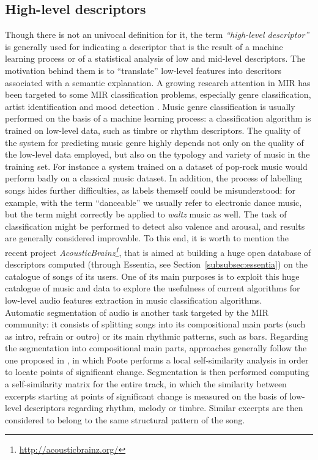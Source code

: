 \subsection{High-level descriptors}
Though there is not an univocal definition for it, the term \textit{``high-level descriptor''} is generally used for indicating a descriptor that is the result of a machine learning process or of a statistical analysis of low and mid-level descriptors. The motivation behind them is to ``translate'' low-level features into descritors associated with a semantic explanation. A growing research attention in MIR has been targeted to some MIR classification problems, especially genre classification, artist identification and mood detection \cite{dimi10}. Music genre classification is usually performed on the basis of a machine learning process: a classification algorithm is trained on low-level data, such as timbre or rhythm descriptors. The quality of the system for predicting music genre highly depends not only on the quality of the low-level data employed, but also on the typology and variety of music in the training set. For instance a system trained on a dataset of pop-rock music would perform badly on a classical music dataset. In addition, the process of labelling songs hides further difficulties, as labels themself could be misunderstood: for example, with the term ``danceable'' we usually refer to electronic dance music, but the term might correctly be applied to \textit{waltz} music as well. The task of classification might be performed to detect also valence and arousal, and results are generally considered improvable. To this end, it is worth to mention the recent project \textit{AcousticBrainz\footnote{\url{http://acousticbrainz.org/}}}, that is aimed at building a huge open database of descriptors computed (through Essentia, see Section~\ref{subsubsec:essentia}) on the catalogue of songs of its users. One of its main purposes is to exploit this huge catalogue of music and data to explore the usefulness of current algorithms for low-level audio features extraction in music classification algorithms. \\
Automatic segmentation of audio is another task targeted by the MIR community: it consists of splitting songs into its compositional main parts (such as intro, refrain or outro) or its main rhythmic patterns, such as bars. Regarding the segmentation into compositional main parts, approaches generally follow the one proposed in \cite{foote00}, in which Foote performs a local self-similarity analysis in order to locate points of significant change. Segmentation is then performed computing a self-similarity matrix for the entire track, in which the similarity between excerpts starting at points of significant change is measured on the basis of low-level descriptors regarding rhythm, melody or timbre. Similar excerpts are then considered to belong to the same structural pattern of the song. 

